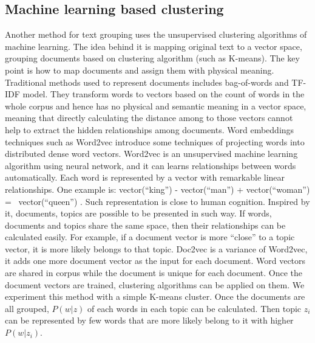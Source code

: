 \subsection{Machine learning based clustering}
\label{sec:Document vector}
Another method for text grouping uses the unsupervised clustering algorithms of machine learning. The idea behind it is mapping original text to a vector space, grouping documents based on clustering algorithm (such as K-means). The key point is how to map documents and assign them with physical meaning. Traditional methods used to represent documents includes bag-of-words and TF-IDF model. They transform words to vectors based on the count of words in the whole corpus and hence has no physical and semantic meaning in a vector space, meaning that directly calculating the distance among to those vectors cannot help to extract the hidden relationships among documents. Word embeddings techniques such as Word2vec \cite{mikolov2013distributed,mikolov2013efficient} introduce some techniques of projecting words into distributed dense word vectors. Word2vec is an unsupervised machine learning algorithm using neural network, and it can learns relationships between words automatically. Each word is represented by a vector with remarkable linear relationships. One example is: vector(“king”) - vector(“man”) + vector(“woman”) =~ vector(“queen”) \cite{journals/corr/cs-CL-0205028}. Such representation is close to human cognition. Inspired by it, documents, topics are possible to be presented in such way. If words, documents and topics share the same space, then their relationships can be calculated easily. For example, if a document vector is more ``close'' to a topic vector, it is more likely belongs to that topic. Doc2vec \cite{le2014distributed} is a variance of Word2vec, it adds one more document vector as the input for each document. Word vectors are shared in corpus while the document is unique for each document. Once the document vectors are trained, clustering algorithms can be applied on them. We experiment this method with a simple K-means cluster. 
Once the documents are all grouped, $P(w|z)$ of each words in each topic can be calculated. Then topic $z_i$ can be represented by few words that are more likely belong to it with higher $P(w|z_i)$.

